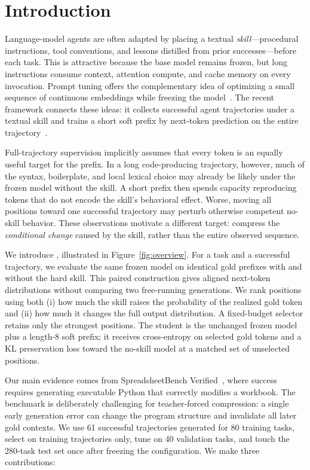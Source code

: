 \section{Introduction}

Language-model agents are often adapted by placing a textual \emph{skill}---procedural instructions, tool conventions, and lessons distilled from prior successes---before each task.  This is attractive because the base model remains frozen, but long instructions consume context, attention compute, and cache memory on every invocation.  Prompt tuning offers the complementary idea of optimizing a small sequence of continuous embeddings while freezing the model~\citep{lester2021prompt,li2021prefix}.  The recent \softskill framework connects these ideas: it collects successful agent trajectories under a textual skill and trains a short soft prefix by next-token prediction on the entire trajectory~\citep{tao2026softskill}.

Full-trajectory supervision implicitly assumes that every token is an equally useful target for the prefix.  In a long code-producing trajectory, however, much of the syntax, boilerplate, and local lexical choice may already be likely under the frozen model without the skill.  A short prefix then spends capacity reproducing tokens that do not encode the skill's behavioral effect.  Worse, moving all positions toward one successful trajectory may perturb otherwise competent no-skill behavior.  These observations motivate a different target: compress the \emph{conditional change} caused by the skill, rather than the entire observed sequence.

We introduce \method, illustrated in Figure~\ref{fig:overview}.  For a task and a successful trajectory, we evaluate the same frozen model on identical gold prefixes with and without the hard skill.  This paired construction gives aligned next-token distributions without comparing two free-running generations.  We rank positions using both (i) how much the skill raises the probability of the realized gold token and (ii) how much it changes the full output distribution.  A fixed-budget selector retains only the strongest positions.  The student is the unchanged frozen model plus a length-8 soft prefix; it receives cross-entropy on selected gold tokens and a KL preservation loss toward the no-skill model at a matched set of unselected positions.

Our main evidence comes from SpreadsheetBench Verified~\citep{ma2024spreadsheetbench}, where success requires generating executable Python that correctly modifies a workbook.  The benchmark is deliberately challenging for teacher-forced compression: a single early generation error can change the program structure and invalidate all later gold contexts.  We use 61 successful trajectories generated for 80 training tasks, select on training trajectories only, tune on 40 validation tasks, and touch the 280-task test set once after freezing the configuration.  We make three contributions:

